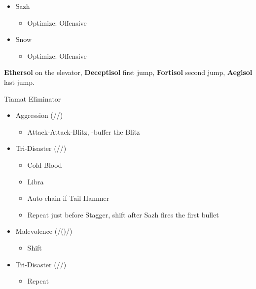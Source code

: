\begin{multicols}{2}
\begin{menu}
\begin{itemize}
\begin{itemize}
\begin{itemize}
\begin{itemize}
            \end{itemize}
        \end{itemize}
        \item Sazh
        \begin{itemize}
            \item Optimize: Offensive
        \end{itemize}
        \item Snow
        \begin{itemize}
            \item Optimize: Offensive
        \end{itemize}
    \end{itemize}
\end{itemize}
\end{menu}
\textbf{Ethersol} on the elevator, \textbf{Deceptisol} first jump, \textbf{Fortisol} second jump, \textbf{Aegisol} last jump.
\renewcommand{\first}{[1] Tireless Charge ((\com)/\com/\med)}
\renewcommand{\second}{[2] Aggression (\com/\com/\rav)}
\renewcommand{\third}{[3] Consolidation (\sen/\sen/\med)}
\renewcommand{\fourth}{[4] Malevolence (\syn/(\rav)/\rav)}
\renewcommand{\fifth}{[5] Smart Bomb (\rav/\rav/\sab)}
\renewcommand{\sixth}{[6] Tri-Disaster (\rav/\rav/\rav)}
\begin{battle}{Tiamat Eliminator}
\begin{itemize}
    \item \second
    \begin{itemize}
        \item Attack-Attack-Blitz, \rav-buffer the Blitz
    \end{itemize}
    \item \sixth
    \begin{itemize}
        \item Cold Blood
        \item Libra
        \item Auto-chain if Tail Hammer
        \item Repeat just before Stagger, shift after Sazh fires the first bullet
    \end{itemize}
    \item \fourth
    \begin{itemize}
        \item Shift
    \end{itemize}
    \item \sixth
    \begin{itemize}
        \item Repeat

\end{itemize}
\end{itemize}
\end{battle}
\end{multicols}
